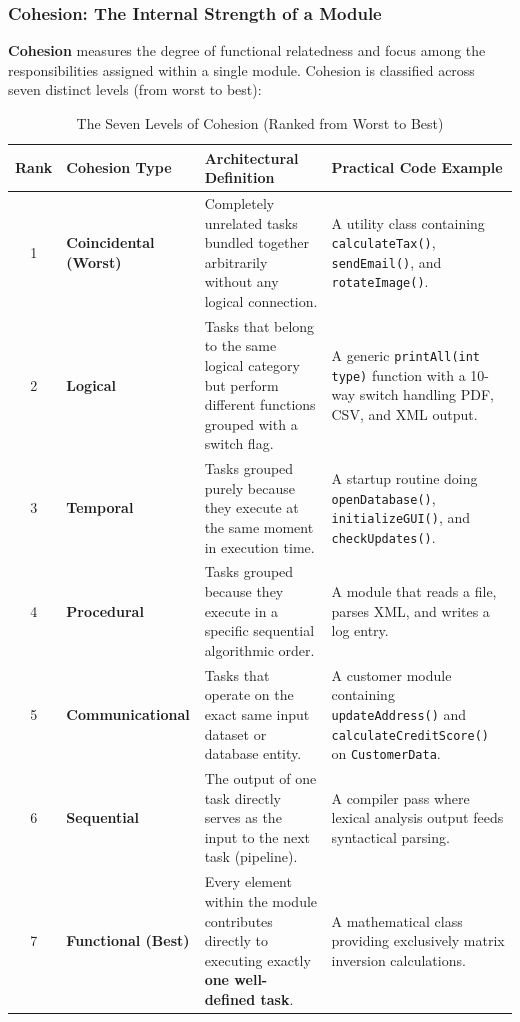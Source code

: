 \subsubsection{Cohesion: The Internal Strength of a Module}
\textbf{Cohesion} measures the degree of functional relatedness and focus among the responsibilities assigned within a single module. Cohesion is classified across seven distinct levels (from worst to best):
\begin{table}[htbp]
\centering
\small
\caption{The Seven Levels of Cohesion (Ranked from Worst to Best)}
\label{tab:cohesion_levels}
\begin{tabularx}{\textwidth}{c l p{5cm} X}
\toprule
\textbf{Rank} & \textbf{Cohesion Type} & \textbf{Architectural Definition} & \textbf{Practical Code Example} \\
\midrule
1 & \textbf{Coincidental (Worst)} & Completely unrelated tasks bundled together arbitrarily without any logical connection. & A utility class containing \texttt{calculateTax()}, \texttt{sendEmail()}, and \texttt{rotateImage()}. \\
2 & \textbf{Logical} & Tasks that belong to the same logical category but perform different functions grouped with a switch flag. & A generic \texttt{printAll(int type)} function with a 10-way switch handling PDF, CSV, and XML output. \\
3 & \textbf{Temporal} & Tasks grouped purely because they execute at the same moment in execution time. & A startup routine doing \texttt{openDatabase()}, \texttt{initializeGUI()}, and \texttt{checkUpdates()}. \\
4 & \textbf{Procedural} & Tasks grouped because they execute in a specific sequential algorithmic order. & A module that reads a file, parses XML, and writes a log entry. \\
5 & \textbf{Communicational} & Tasks that operate on the exact same input dataset or database entity. & A customer module containing \texttt{updateAddress()} and \texttt{calculateCreditScore()} on \texttt{CustomerData}. \\
6 & \textbf{Sequential} & The output of one task directly serves as the input to the next task (pipeline). & A compiler pass where lexical analysis output feeds syntactical parsing. \\
7 & \textbf{Functional (Best)} & Every element within the module contributes directly to executing exactly \textbf{one well-defined task}. & A mathematical class providing exclusively matrix inversion calculations. \\
\bottomrule
\end{tabularx}
\end{table}

